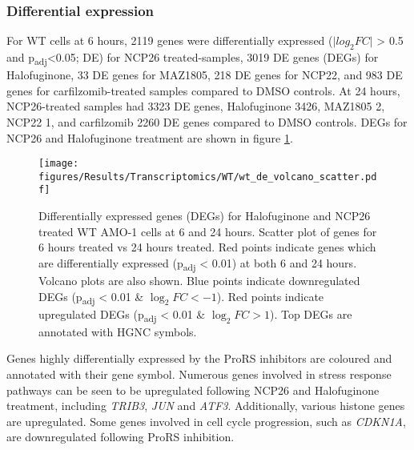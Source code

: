 \subsubsection{Differential expression}
For WT cells at 6 hours, 2119 genes were differentially expressed ($\lvert log_{2}FC \rvert$ > 0.5 and p\textsubscript{adj}<0.05; DE) for NCP26 treated-samples, 3019 DE genes (DEGs) for Halofuginone, 33 DE genes for MAZ1805, 218 DE genes for NCP22, and 983 DE genes for carfilzomib-treated samples compared to DMSO controls.
At 24 hours, NCP26-treated samples had 3323 DE genes, Halofuginone 3426, MAZ1805 2, NCP22 1, and carfilzomib 2260 DE genes compared to DMSO controls.
DEGs for NCP26 and Halofuginone treatment are shown in figure \ref{fig:wt_de}.
%
\begin{figure}[htb]
\centering
\texttt{[image: figures/Results/Transcriptomics/WT/wt\_de\_volcano\_scatter.pdf]}
\caption[Differentially expressed genes WT AMO-1 cells]{Differentially expressed genes (DEGs) for Halofuginone and NCP26 treated WT AMO-1 cells at 6 and 24 hours.
Scatter plot of genes for 6 hours treated vs 24 hours treated.
Red points indicate genes which are differentially expressed (p\textsubscript{adj} < 0.01) at both 6 and 24 hours.
Volcano plots are also shown.
Blue points indicate downregulated DEGs (p\textsubscript{adj} < 0.01 \& $\log_{2}FC < -1$).
Red points indicate upregulated DEGs (p\textsubscript{adj} < 0.01 \& $\log_{2}FC > 1$).
Top DEGs are annotated with HGNC symbols.
}
\label{fig:wt_de}
\end{figure}
Genes highly differentially expressed by the ProRS inhibitors are coloured and annotated with their gene symbol.
Numerous genes involved in stress response pathways can be seen to be upregulated following NCP26 and Halofuginone treatment, including \textit{TRIB3}, \textit{JUN} and \textit{ATF3}.
Additionally, various histone genes are upregulated.
Some genes involved in cell cycle progression, such as \textit{CDKN1A}, are downregulated following ProRS inhibition.

